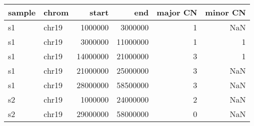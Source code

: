 \documentclass{standalone}
\begin{document}
\begin{tabular}{llrrrr}
\toprule
sample & chrom & start & end & major CN & minor CN \\
\midrule
s1 & chr19 & 1000000 & 3000000 & 1 & NaN \\
s1 & chr19 & 3000000 & 11000000 & 1 & 1 \\
s1 & chr19 & 14000000 & 21000000 & 3 & 1 \\
s1 & chr19 & 21000000 & 25000000 & 3 & NaN \\
s1 & chr19 & 28000000 & 58500000 & 3 & NaN \\
s2 & chr19 & 1000000 & 24000000 & 2 & NaN \\
s2 & chr19 & 29000000 & 58000000 & 0 & NaN \\
\bottomrule
\end{tabular}
\end{document}
